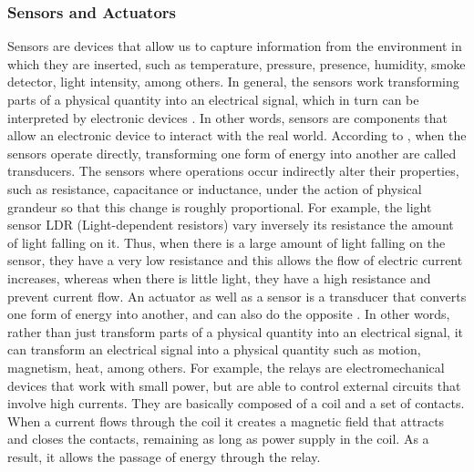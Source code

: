 \documentclass{acm_proc_article-sp}
\begin{document}
\subsubsection{Sensors and Actuators}
Sensors are devices that allow us to capture information from the environment in which they are inserted, such as temperature, pressure, presence, humidity, smoke detector, light intensity, among others. In general, the sensors work transforming parts of a physical quantity into an electrical signal, which in turn can be interpreted by electronic devices \cite{borges2010automaccao}. In other words, sensors are components that allow an electronic device to interact with the real world.
\newline
\newline
According to \cite{borges2010automaccao}, when the sensors operate directly, transforming one form of energy into another are called transducers. The sensors where operations occur indirectly alter their properties, such as resistance, capacitance or inductance, under the action of physical grandeur so that this change is roughly proportional. For example, the light sensor LDR (Light-dependent resistors) vary inversely its resistance the amount of light falling on it. Thus, when there is a large amount of light falling on the sensor, they have a very low resistance and this allows the flow of electric current increases, whereas when there is little light, they have a high resistance and prevent current flow.
\newline
\newline
An actuator as well as a sensor is a transducer that converts one form of energy into another, and can also do the opposite \cite{borges2010automaccao}. In other words, rather than just  transform parts of a physical quantity into an electrical signal, it can transform an electrical signal into a physical quantity such as motion, magnetism, heat, among others. For example, the relays are electromechanical devices that work with small power, but are able to control external circuits that involve high currents. They are basically composed of a coil and a set of contacts. When a current flows through the coil it creates a magnetic field that attracts and closes the contacts, remaining as long as power supply in the coil. As a result, it allows the passage of energy through the relay.
\end{document}
